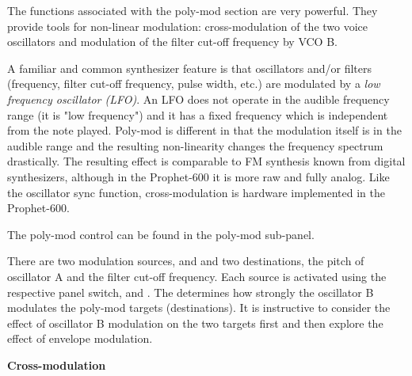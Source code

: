 The functions associated with the poly-mod section are very powerful. They provide tools for non-linear modulation: cross-modulation of the two voice oscillators and modulation of the filter cut-off frequency by VCO B. 

A familiar and common synthesizer feature is that oscillators and/or filters (frequency, filter cut-off frequency, pulse width, etc.) are modulated by a \textit{low frequency oscillator (LFO)}. An LFO does not operate in the audible frequency range (it is "low frequency") and it has a fixed frequency which is independent from the note played. Poly-mod is different in that the modulation itself is in the audible range and the resulting non-linearity changes the frequency spectrum drastically. The resulting effect is comparable to FM synthesis known from digital synthesizers, although in the Prophet-600 it is more raw and fully analog. Like the oscillator sync function, cross-modulation is hardware implemented in the Prophet-600.

The poly-mod control can be found in the poly-mod sub-panel. 

\begin{center}
\end{center}

There are two modulation sources, \polymodenv and \polymodosc and two destinations, the pitch of oscillator A  and the filter cut-off frequency. Each source is activated using the respective panel switch, \polymodfreq and \polymodfilter. The \polymodosc  determines how strongly the oscillator B modulates the poly-mod targets (destinations). It is instructive to consider the effect of oscillator B modulation on the two targets first and then explore the effect of envelope modulation.

\textbf{Cross-modulation}

